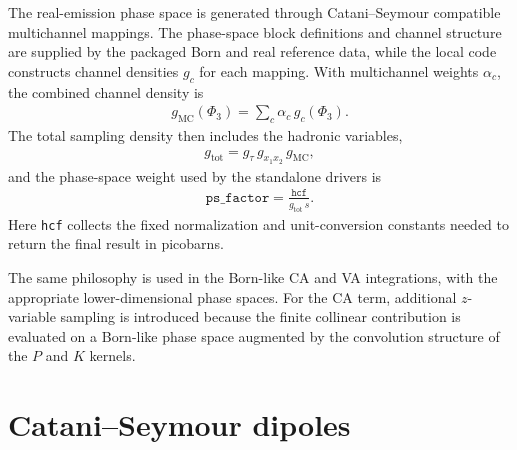 \documentclass[11pt]{article}
\begin{document}
The real-emission phase space is generated through Catani--Seymour compatible multichannel mappings.
The phase-space block definitions and channel structure are supplied by the packaged Born and real reference data,
while the local code constructs channel densities $g_c$ for each mapping.
With multichannel weights $\alpha_c$, the combined channel density is
\begin{align}
g_{\text{MC}}(\Phi_3) = \sum_c \alpha_c\,g_c(\Phi_3).
\end{align}
The total sampling density then includes the hadronic variables,
\begin{align}
g_{\text{tot}} = g_{\tau}\,g_{x_1x_2}\,g_{\text{MC}},
\end{align}
and the phase-space weight used by the standalone drivers is
\begin{align}
\texttt{ps\_factor} = \frac{\texttt{hcf}}{g_{\text{tot}}\,\hat s}.
\end{align}
Here \texttt{hcf} collects the fixed normalization and unit-conversion constants needed to return the final result in picobarns.

The same philosophy is used in the Born-like CA and VA integrations, with the appropriate lower-dimensional phase spaces.
For the CA term, additional $z$-variable sampling is introduced because the finite collinear contribution is evaluated on a Born-like phase space augmented by the convolution structure of the $P$ and $K$ kernels.

\section{Catani--Seymour dipoles}
\end{document}
